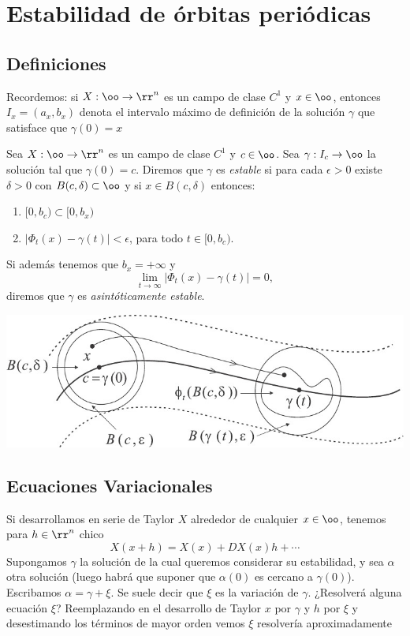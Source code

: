 \section{Estabilidad de órbitas periódicas}

\subsection{Definiciones} 
 Recordemos: si $X:\oo\to\rr^n$ es un campo de clase $C^1$ y  $x\in\oo$, entonces $I_x=(a_x,b_x)$ denota el intervalo máximo
 de definición de la solución $\gamma$ que satisface que $\gamma(0)=x$

 \begin{definicion}
 Sea $X:\oo\to\rr^n$ es un campo de clase $C^1$ y  $c\in\oo$. Sea $\gamma:I_c\to\oo$ la solución tal que 
 $\gamma(0)=c$. Diremos que $\gamma$ es \emph{estable} si para cada $\epsilon>0$ existe $\delta>0$ con 
 $B(c,\delta)\subset\oo$ y si $x\in B(c,\delta)$ entonces:
 \begin{enumerate}
  \item $[0,b_c)\subset [0,b_x)$
  \item $|\Phi_t(x)-\gamma(t)|<\epsilon$, para todo $t\in[0,b_c)$. 
 \end{enumerate}
  Si además tenemos que $b_x=+\infty$ y
 \[\lim_{t\to\infty}|\Phi_t(x)-\gamma(t)|=0, \]
 diremos que $\gamma$ es \emph{asintóticamente estable}.
\end{definicion}


   \begin{center}
   \includegraphics[scale=0.4]{imagenes/estabilidad_gral.jpg}
   \end{center}




\subsection{Ecuaciones Variacionales}

 Si desarrollamos en serie de Taylor $X$ alrededor de cualquier $x\in\oo$, tenemos para $h\in\rr^n$ chico
 \[X(x+h)=X(x)+DX(x)h+\cdots\]
Supongamos $\gamma$ la solución de la cual queremos considerar su estabilidad, y sea $\alpha$ otra solución 
(luego habrá que suponer que $\alpha(0)$ es cercano a $\gamma(0)$). Escribamos $\alpha=\gamma+\xi$. Se suele
decir que $\xi$ es la variación de $\gamma$. ¿Resolverá alguna ecuación $\xi$? Reemplazando en el desarrollo de Taylor
$x$ por $\gamma$ y $h$ por $\xi$ y desestimando los términos de mayor orden vemos $\xi$ resolvería aproximadamente

